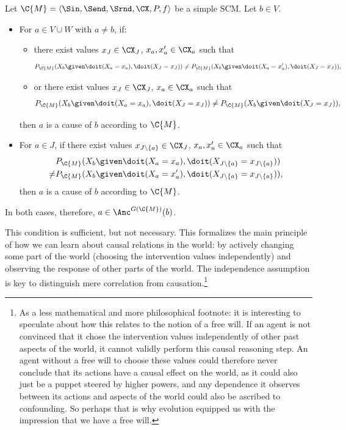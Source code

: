 \begin{Cor}\label{cor:scm_identify_causal_relation}
  Let $\C{M} = \langle \Sin, \Send, \Srnd, \CX, P, f \rangle$ be a simple SCM.
  Let $b \in V$.

  \begin{itemize}
    \item For $a \in V \cup W$ with $a \ne b$, if:
  \begin{itemize}
    \item there exist values $x_J \in \CX_J$, $x_a,x_a' \in \CX_a$ such that
      $$P_{\C{M}}(X_b \given \doit(X_a=x_a),\doit(X_J=x_J)) \ne P_{\C{M}}(X_b \given \doit(X_a=x_a'),\doit(X_J=x_J)),$$
    \item or there exist values $x_J \in \CX_J$, $x_a \in \CX_a$ such that
  $$P_{\C{M}}(X_b \given \doit(X_a=x_a),\doit(X_J=x_J)) \ne P_{\C{M}}(X_b \given \doit(X_J=x_J)),$$
  \end{itemize}
  then $a$ is a cause of $b$ according to $\C{M}$.  
    \item For $a \in J$, if there exist values $x_{J\setminus\{a\}} \in \CX_J$, $x_a,x_a' \in \CX_a$ 
  such that
      \begin{equation*}\begin{split}
        & P_{\C{M}}(X_b \given \doit(X_a=x_a),\doit(X_{J\setminus \{a\}}=x_{J\setminus \{a\}})) \\
        \ne & P_{\C{M}}(X_b \given \doit(X_a=x_a'),\doit(X_{J\setminus\{a\}}=x_{J\setminus\{a\}})),
      \end{split}\end{equation*}
  then $a$ is a cause of $b$ according to $\C{M}$.
  \end{itemize}
  In both cases, therefore, $a \in \Anc^{G(\C{M})}(b)$.
\end{Cor}
This condition is sufficient, but not necessary.
This formalizes the main principle of how we can learn about causal relations in
the world: by actively changing some part of the world (choosing the intervention values independently) and observing
the response of other parts of the world.
The independence assumption is key to distinguish mere correlation from causation.\footnote{As a less mathematical
and more philosophical footnote: it is interesting
to speculate about how this relates to the notion of a free will. 
If an agent is not convinced that it chose the intervention values independently of other past
aspects of the world, it cannot validly perform this causal reasoning step. An agent without a free will
to choose these values could therefore never conclude that its actions have a causal effect on the world,
as it could also just be a puppet steered by higher powers, and any dependence it observes between its actions 
and aspects of the world 
could also be ascribed to confounding. So perhaps that is why evolution equipped us with the impression that we have a free will.}

